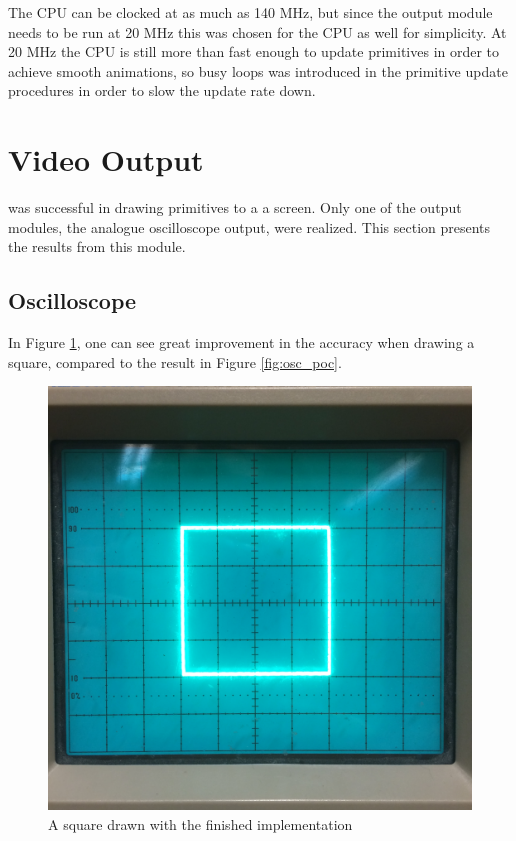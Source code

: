The CPU can be clocked at as much as 140 MHz, but since the output module needs to be run at 20 MHz this was chosen for the CPU as well for simplicity.
At 20 MHz the CPU is still more than fast enough to update primitives in order to achieve smooth animations, so busy loops was introduced in the primitive update procedures in order to slow the update rate down.

\section{Video Output}
\vthreek was successful in drawing primitives to a a screen.
Only one of the output modules, the analogue oscilloscope output, were realized.
This section presents the results from this module.

\subsection{Oscilloscope}
In Figure \ref{fig:square}, one can see great improvement in the accuracy when drawing a square, compared to the result in Figure \ref{fig:osc_poc}.

\begin{figure}[h!]
	    \includegraphics[width=\linewidth]{images/square}
	    \caption{A square drawn with the finished implementation}
	    \label{fig:square}
\end{figure}


